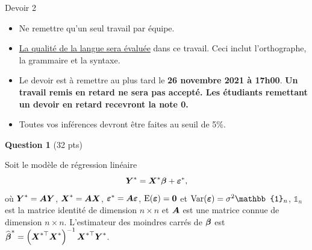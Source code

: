 \documentclass[letter, 11pt]{article}
\newcommand{\bm}{\boldmath}
\newcommand{\um}{\unboldmath}
\newcommand{\boY}{\mbox{\bm$Y$\um}}
\newcommand{\bobeta}{\mbox{\bm$\beta$}}
\newcommand{\boeps}{\mbox{\bm$\varepsilon$\um}}
\newcommand{\bo}[1]{\mbox{\bm$#1$\um}}
\begin{document}
\begin{center}
{\Large Devoir 2 }
\end{center}

\begin{itemize}
\item Ne remettre qu'un seul travail par équipe.
\item \underline{La qualité de la langue sera évaluée} dans ce travail. Ceci inclut l'orthographe, la grammaire et la syntaxe.
\item Le devoir est à remettre au plus tard le {\bf 26 novembre 2021 à 17h00}. {\bf Un travail remis en retard ne sera pas accepté. Les étudiants remettant un devoir en retard recevront la note 0.}
\item Toutes vos inférences devront être faites au seuil de 5\%.
\end{itemize}

\vspace{0.1 in}
\textbf{Question 1} (32 pts)
\vspace{0.1in}

Soit le mod\`ele de r\'egression lin\'eaire 
$$\boY^*=\bo{X}^*\bobeta+\boeps^*,$$
o\`u $\boY^* = \bo{A} \boY$, $ \bo{X}^* = \bo{A}\bo{X}$, $\boeps^* = \bo{A}\boeps$,
$\mathrm{E}(\boeps) = {\bf 0}$ et $\mathrm{Var}(\boeps)=\sigma^2 \mathbb{1}_n $, $\mathbb{1}_n$ est la matrice identit\'e de dimension $n\times n$ et $\bo{A}$ est une matrice connue de dimension $n\times n$. L'estimateur des moindres carrés de $\bobeta$ est $\widehat{\bobeta}^* = \left(\bo{X}^{*\top}\bo{X}^*\right)^{-1} \bo{X}^{*\top} \bo{Y}^*$.
\end{document}
